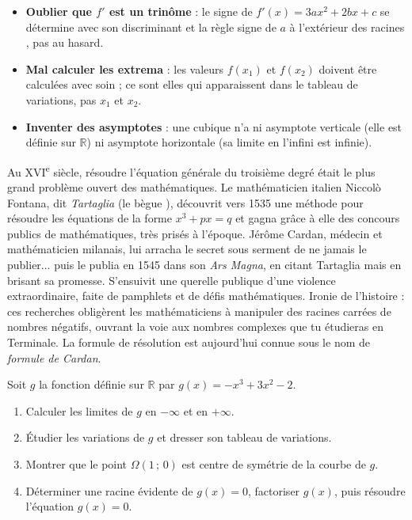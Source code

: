 \documentclass[11pt]{article}
\newcommand{\cle}[1]{{\popxbold\color{popdark}#1}}
\begin{document}
\begin{attention}
\begin{itemize}
\item \textbf{Oublier que $f'$ est un trinôme} : le signe de $f'(x) = 3ax^2 + 2bx + c$ se détermine avec son discriminant et la règle \og signe de $a$ à l'extérieur des racines \fg, pas au hasard.
\item \textbf{Mal calculer les extrema} : les valeurs $f(x_1)$ et $f(x_2)$ doivent être calculées avec soin ; ce sont elles qui apparaissent dans le tableau de variations, pas $x_1$ et $x_2$.
\item \textbf{Inventer des asymptotes} : une cubique n'a ni asymptote verticale (elle est définie sur $\mathbb{R}$) ni asymptote horizontale (sa limite en l'infini est infinie).
\end{itemize}
\end{attention}

\begin{savaistu}
Au XVI\textsuperscript{e} siècle, résoudre l'équation générale du troisième degré était le plus grand problème ouvert des mathématiques. Le mathématicien italien Niccolò Fontana, dit \emph{Tartaglia} (\og le bègue \fg), découvrit vers 1535 une méthode pour résoudre les équations de la forme $x^3 + px = q$ et gagna grâce à elle des concours publics de mathématiques, très prisés à l'époque. Jérôme Cardan, médecin et mathématicien milanais, lui arracha le secret sous serment de ne jamais le publier... puis le publia en 1545 dans son \emph{Ars Magna}, en citant Tartaglia mais en brisant sa promesse. S'ensuivit une querelle publique d'une violence extraordinaire, faite de pamphlets et de défis mathématiques. Ironie de l'histoire : ces recherches obligèrent les mathématiciens à manipuler des racines carrées de nombres négatifs, ouvrant la voie aux \cle{nombres complexes} que tu étudieras en Terminale. La formule de résolution est aujourd'hui connue sous le nom de \emph{formule de Cardan}.
\end{savaistu}

\begin{exercice}
Soit $g$ la fonction définie sur $\mathbb{R}$ par $g(x) = -x^3 + 3x^2 - 2$.
\begin{enumerate}
\item Calculer les limites de $g$ en $-\infty$ et en $+\infty$.
\item Étudier les variations de $g$ et dresser son tableau de variations.
\item Montrer que le point $\Omega(1\,;\,0)$ est centre de symétrie de la courbe de $g$.
\item Déterminer une racine évidente de $g(x) = 0$, factoriser $g(x)$, puis résoudre l'équation $g(x) = 0$.
\end{enumerate}
\end{exercice}
\end{document}
